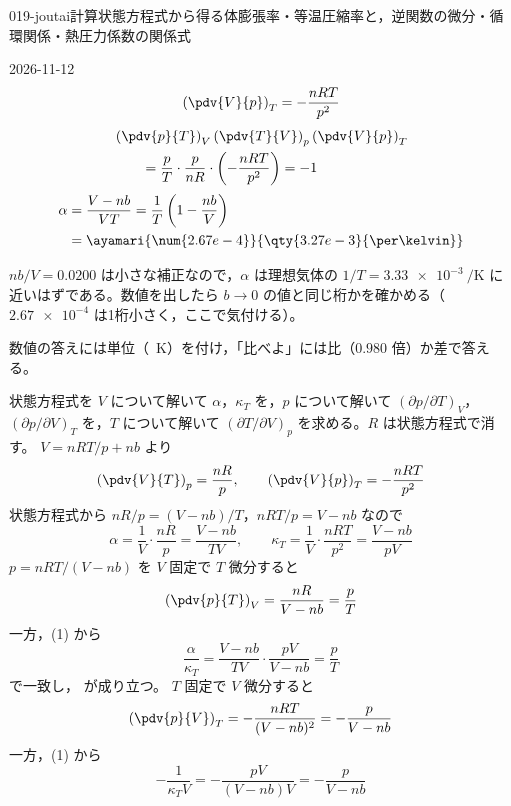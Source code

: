\documentclass[uplatex,dvipdfmx,a4paper,11pt]{jsarticle}
\begin{document}
\begin{mondai}{019-joutai}{計算}{状態方程式から得る体膨張率・等温圧縮率と，逆関数の微分・循環関係・熱圧力係数の関係式}
\begin{kotaeutsushi}{2026-11-12}
\[ \left(\pdv{V}{p}\right)_{T}=-\frac{nRT}{p^{2}} \]
\begin{align*}
&\left(\pdv{p}{T}\right)_{V}\left(\pdv{T}{V}\right)_{p}\left(\pdv{V}{p}\right)_{T}\\
&\qquad=\frac{p}{T}\cdot\frac{p}{nR}\cdot\left(-\frac{nRT}{p^{2}}\right)=-1
\end{align*}
\begin{align*}
\alpha&=\frac{V-nb}{VT}=\frac{1}{T}\left(1-\frac{nb}{V}\right)\\
&=\ayamari{\num{2.67e-4}}{\qty{3.27e-3}{\per\kelvin}}
\end{align*}
\end{kotaeutsushi}
\begin{kizuki}
\item $nb/V=0.0200$ は小さな補正なので，$\alpha$ は理想気体の $1/T=\qty{3.33e-3}{\per\kelvin}$ に近いはずである。数値を出したら $b\to0$ の値と同じ桁かを確かめる（$\num{2.67e-4}$ は1桁小さく，ここで気付ける）。
\item 数値の答えには単位（\unit{\per\kelvin}）を付け，「比べよ」には比（$0.980$ 倍）か差で答える。
\end{kizuki}
\begin{tadashii}
\houshin 状態方程式を $V$ について解いて $\alpha$，$\kappa_{T}$ を，$p$ について解いて $(\partial p/\partial T)_{V}$，$(\partial p/\partial V)_{T}$ を，$T$ について解いて $(\partial T/\partial V)_{p}$ を求める。$R$ は状態方程式で消す。
\keisan {} $V = nRT/p + nb$ より
\[ \left(\pdv{V}{T}\right)_{p} = \frac{nR}{p}, \qquad \left(\pdv{V}{p}\right)_{T} = -\frac{nRT}{p^{2}} \]
状態方程式から $nR/p = (V - nb)/T$，$nRT/p = V - nb$ なので
\[ \alpha = \frac{1}{V}\cdot\frac{nR}{p} = \frac{V - nb}{TV}, \qquad \kappa_{T} = \frac{1}{V}\cdot\frac{nRT}{p^{2}} = \frac{V - nb}{pV} \]
 $p = nRT/(V - nb)$ を $V$ 固定で $T$ 微分すると
\[ \left(\pdv{p}{T}\right)_{V} = \frac{nR}{V - nb} = \frac{p}{T} \]
一方，(1) から
\[ \frac{\alpha}{\kappa_{T}} = \frac{V - nb}{TV}\cdot\frac{pV}{V - nb} = \frac{p}{T} \]
で一致し， が成り立つ。
 $T$ 固定で $V$ 微分すると
\[ \left(\pdv{p}{V}\right)_{T} = -\frac{nRT}{(V - nb)^{2}} = -\frac{p}{V - nb} \]
一方，(1) から
\[ -\frac{1}{\kappa_{T}V} = -\frac{pV}{(V - nb)V} = -\frac{p}{V - nb} \]

\end{tadashii}
\end{mondai}
\end{document}
